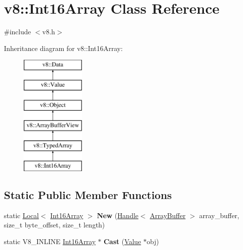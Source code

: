 \hypertarget{classv8_1_1_int16_array}{}\section{v8\+:\+:Int16\+Array Class Reference}
\label{classv8_1_1_int16_array}


{\ttfamily \#include $<$v8.\+h$>$}

Inheritance diagram for v8\+:\+:Int16\+Array\+:\begin{figure}[H]
\begin{center}
\leavevmode
\includegraphics[height=6.000000cm]{classv8_1_1_int16_array}
\end{center}
\end{figure}
\subsection*{Static Public Member Functions}
\begin{DoxyCompactItemize}
\item 
\hypertarget{classv8_1_1_int16_array_adc49fddf7e0b2c719085f5f9af3762e5}{}static \hyperlink{classv8_1_1_local}{Local}$<$ \hyperlink{classv8_1_1_int16_array}{Int16\+Array} $>$ {\bfseries New} (\hyperlink{classv8_1_1_handle}{Handle}$<$ \hyperlink{classv8_1_1_array_buffer}{Array\+Buffer} $>$ array\+\_\+buffer, size\+\_\+t byte\+\_\+offset, size\+\_\+t length)\label{classv8_1_1_int16_array_adc49fddf7e0b2c719085f5f9af3762e5}

\item 
\hypertarget{classv8_1_1_int16_array_abef12f11ace9c74a4ce451db28b954e5}{}static V8\+\_\+\+I\+N\+L\+I\+N\+E \hyperlink{classv8_1_1_int16_array}{Int16\+Array} $\ast$ {\bfseries Cast} (\hyperlink{classv8_1_1_value}{Value} $\ast$obj)\label{classv8_1_1_int16_array_abef12f11ace9c74a4ce451db28b954e5}

\end{DoxyCompactItemize}
